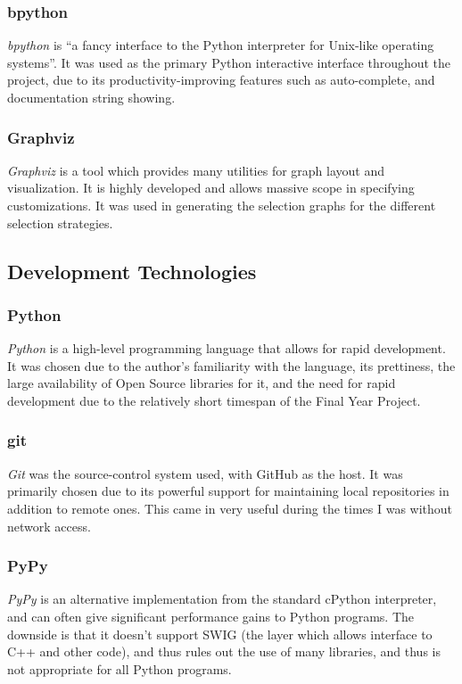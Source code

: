 \documentclass[a4paper,11pt]{report}
\begin{document}
\subsubsection*{bpython}
\emph{bpython} \citep{prog:bpython} is ``a fancy interface to the Python interpreter for Unix-like operating systems''. It was used as the primary Python interactive interface throughout the project, due to its productivity-improving features such as auto-complete, and documentation string showing.

\subsubsection*{Graphviz}
\emph{Graphviz} \citep{prog:graphviz} is a tool which provides many utilities for graph layout and visualization. It is highly developed and allows massive scope in specifying customizations. It was used in generating the selection graphs for the different selection strategies. 

\subsection{Development Technologies}

\subsubsection*{Python}
\emph{Python} \citep{prog:python} is a high-level programming language that allows for rapid development. It was chosen due to the author's familiarity with the language, its prettiness, the large availability of Open Source libraries for it, and the need for rapid development due to the relatively short timespan of the Final Year Project.

\subsubsection*{git}
\emph{Git} \citep{prog:git} was the source-control system used, with GitHub as the host. It was primarily chosen due to its powerful support for maintaining local repositories in addition to remote ones. This came in very useful during the times I was without network access.

\subsubsection*{PyPy}
\emph{PyPy} \citep{prog:pypy} is an alternative implementation from the standard cPython interpreter, and can often give significant performance gains to Python programs. The downside is that it doesn't support SWIG (the layer which allows interface to C++ and other code), and thus rules out the use of many libraries, and thus is not appropriate for all Python programs.
\end{document}
